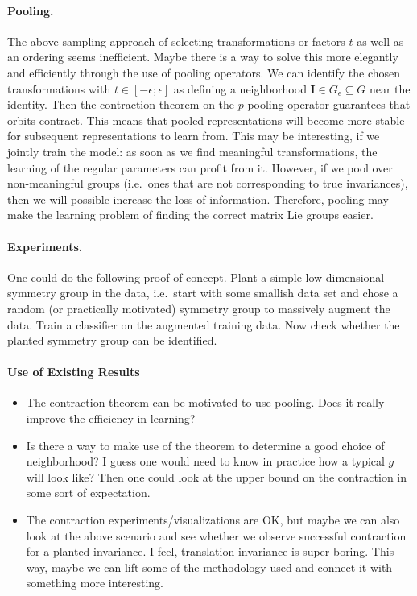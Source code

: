 \documentclass{article}
\newcommand{\mat}[1]{{\mathbf #1}}
\begin{document}
\paragraph{Pooling.} 

The above sampling approach of selecting transformations or factors $t$ as well as an ordering seems inefficient. Maybe there is a way to solve this more elegantly and efficiently through the use of pooling operators. We can identify the chosen transformations with $t \in [-\epsilon; \epsilon]$ as defining a neighborhood $\mat I \in G_\epsilon \subseteq G$ near the identity. Then the contraction theorem on the $p$-pooling operator guarantees that orbits contract. This means that pooled representations will become more stable for subsequent representations to learn from. This may be interesting, if we jointly train the model: as soon as we find meaningful transformations, the learning of the regular parameters can profit from it.  However, if we pool over non-meaningful groups (i.e.~ones that are not corresponding  to true invariances), then we will possible increase the loss of information. Therefore, pooling may make the learning problem of finding the correct matrix Lie groups easier. 

\paragraph{Experiments.} One could do the following proof of concept. Plant a simple low-dimensional symmetry group in the data, i.e.~start with some smallish data set and chose a random (or practically motivated) symmetry group to massively augment the data. Train a classifier on the augmented training data. Now check whether the planted symmetry group can be identified. 

\paragraph{Use of Existing Results}

\begin{itemize}
\item The contraction theorem can be motivated to use pooling. Does it really improve the efficiency in learning? 
\item Is there a way to make use of the theorem to determine a good choice of neighborhood? I guess one would need to know in practice how a typical $g$ will look like? Then one could look at the upper bound on the  contraction in some sort of expectation. 
\item The contraction experiments/visualizations are OK, but maybe we can also look at the above scenario and see whether we observe successful contraction for a planted invariance. I feel, translation invariance is super boring. This way, maybe we can lift some of the methodology used and connect it with something more interesting. 
\end{itemize}
\end{document}
